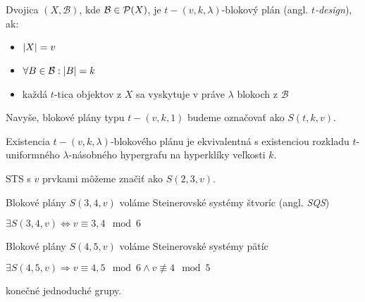 \begin{definition}
Dvojica $(X, \mathcal{B})$, kde $\mathcal{B} \in \mathcal{P}(X)$, je $t-(v, k, \lambda)$-blokový plán (angl. \emph{$t$-design}), ak:
\begin{itemize}
    \item $\left|X\right| = v$
    \item $\forall B \in \mathcal{B}: \left|B\right| = k$
    \item každá $t$-tica objektov z $X$ sa vyskytuje v práve $\lambda$ blokoch z $\mathcal{B}$
\end{itemize}

Navyše, blokové plány typu $t-(v,k,1)$ budeme označovať ako $S(t,k,v)$.
\end{definition}

\begin{remark}
Existencia $t-(v,k,\lambda)$-blokového plánu je ekvivalentná s existenciou rozkladu $t$-uniformného $\lambda$-násobného hypergrafu na hyperklíky veľkosti $k$.
\end{remark}

\begin{remark}
STS s $v$ prvkami môžeme značiť ako $S(2,3,v)$.
\end{remark}

\begin{definition}
Blokové plány $S(3,4,v)$ voláme Steinerovské systémy štvoríc (angl. \emph{SQS})
\end{definition}

\begin{theorem_hard}

$\exists S(3,4,v) \Longleftrightarrow v \equiv 3,4 \mod 6$

\end{theorem_hard}


\begin{definition}
Blokové plány $S(4,5,v)$ voláme Steinerovské systémy pätíc
\end{definition}


\begin{theorem_hard}

$\exists S(4,5,v) \Longrightarrow v \equiv 4,5 \mod 6 \wedge v \not\equiv 4 \mod 5$

\end{theorem_hard}

\TODO konečné jednoduché grupy.
